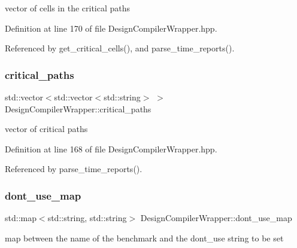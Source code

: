 vector of cells in the critical paths 



Definition at line 170 of file Design\+Compiler\+Wrapper.\+hpp.



Referenced by get\+\_\+critical\+\_\+cells(), and parse\+\_\+time\+\_\+reports().

\mbox{\label{classDesignCompilerWrapper_aa27eec3667b5f84ae2b95ebcd13d4e32}} 
\subsubsection{\texorpdfstring{critical\+\_\+paths}{critical\_paths}}
{\footnotesize\ttfamily std\+::vector$<$std\+::vector$<$std\+::string$>$ $>$ Design\+Compiler\+Wrapper\+::critical\+\_\+paths\hspace{0.3cm}{\ttfamily [protected]}}



vector of critical paths 



Definition at line 168 of file Design\+Compiler\+Wrapper.\+hpp.



Referenced by parse\+\_\+time\+\_\+reports().

\mbox{\label{classDesignCompilerWrapper_a4539c1322e9140e3c228bf8d3fe28fff}} 
\subsubsection{\texorpdfstring{dont\+\_\+use\+\_\+map}{dont\_use\_map}}
{\footnotesize\ttfamily std\+::map$<$std\+::string, std\+::string$>$ Design\+Compiler\+Wrapper\+::dont\+\_\+use\+\_\+map\hspace{0.3cm}{\ttfamily [protected]}}



map between the name of the benchmark and the dont\+\_\+use string to be set 



